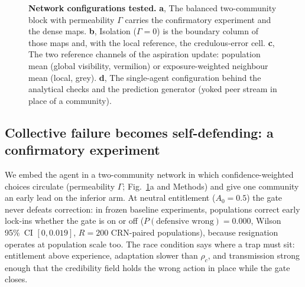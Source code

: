 \documentclass[11pt]{article}
\newcommand{\1}{\mathbf{1}}
\begin{document}
\begin{figure}[t]
{}%
\caption{\textbf{Network configurations tested.} \textbf{a}, The balanced two-community
block with permeability $\Gamma$ carries the confirmatory experiment and the dense
maps. \textbf{b}, Isolation ($\Gamma=0$) is the boundary column of those maps and,
with the local reference, the credulous-error cell. \textbf{c}, The two reference
channels of the aspiration update: population mean (global visibility, vermilion) or
exposure-weighted neighbour mean (local, grey). \textbf{d}, The single-agent
configuration behind the analytical checks and the prediction generator (yoked peer
stream in place of a community).}
\label{fig:nets}
\end{figure}

\subsection{Collective failure becomes self-defending: a confirmatory experiment}

We embed the agent in a two-community network in which confidence-weighted choices circulate (permeability $\Gamma$; Fig.~\ref{fig:nets}a and Methods) and give one community an early lead on the inferior arm. At neutral entitlement ($A_0=0.5$) the gate never defeats correction: in frozen baseline experiments, populations correct early lock-ins whether the gate is on or off ($P(\text{defensive wrong})=0.000$, Wilson 95\%~CI $[0,0.019]$, $R=200$ CRN-paired populations), because resignation operates at population scale too. The race condition says where a trap must sit: entitlement above experience, adaptation slower than $\rho_c$, and transmission strong enough that the credibility field holds the wrong action in place while the gate closes.
\end{document}
